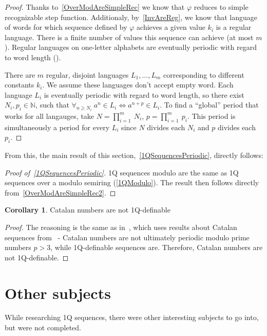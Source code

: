 \documentclass[12pt]{article}
\theoremstyle{definition}
\newtheorem{corollary}{Corollary}[section]
\begin{document}
\begin{proof}
    Thanks to~\cref{OverModAreSimpleRec} we know that $\varphi$ reduces to simple recognizable step function. Additionaly, by~\cref{InvAreReg}, we know that language of words for which sequence defined by $\varphi$ achieves a given value $k_i$ is a regular language. There is a finite number of values this sequence can achieve (at most $m$). Regular languages on one-letter alphabets are eventually periodic with regard to word length (\cite[Theorem 1]{PighizziniS02}).

    There are $m$ regular, disjoint languages $L_1, \ldots, L_m$ corresponding to different constants $k_i$. We assume these languages don't accept empty word. Each language $L_i$ is eventually periodic with regard to word length, so there exist $N_i, p_i \in \mathbb{N}$, such that $\forall_{n \geq N_i} \ a^n \in L_i \iff a^{n + p} \in L_i$. To find a ``global'' period that works for all langauges, take $N = \prod_{i=1}^m \ N_i$, $p = \prod_{i=1}^m \ p_i$. This period is simultaneously a period for every $L_i$ since $N$ divides each $N_i$ and $p$ divides each $p_i$.
\end{proof}

From this, the main result of this section,~\cref{1QSequencesPeriodic}, directly follows:

\begin{proof}[Proof of~\cref{1QSequencesPeriodic}]
    1Q sequences modulo are the same as 1Q sequences over a modulo semiring (\cref{1QModulo}). The result then follows directly from~\cref{OverModAreSimpleRec2}.
\end{proof}

\begin{corollary}
    Catalan numbers are not 1Q-definable
\end{corollary}

\begin{proof}
    The reasoning is the same as in~\cite[Theorem 7, Corollary 8]{CadilhacMPPS20}, which uses results about Catalan sequences from~\cite{KubotaCatalan} - Catalan numbers are not ultimately periodic modulo prime numbers $p > 3$, while 1Q-definable sequences are. Therefore, Catalan numbers are not 1Q-definable.
\end{proof}

\section{Other subjects}
While researching 1Q sequences, there were other interesting subjects to go into, but were not completed.
\end{document}
